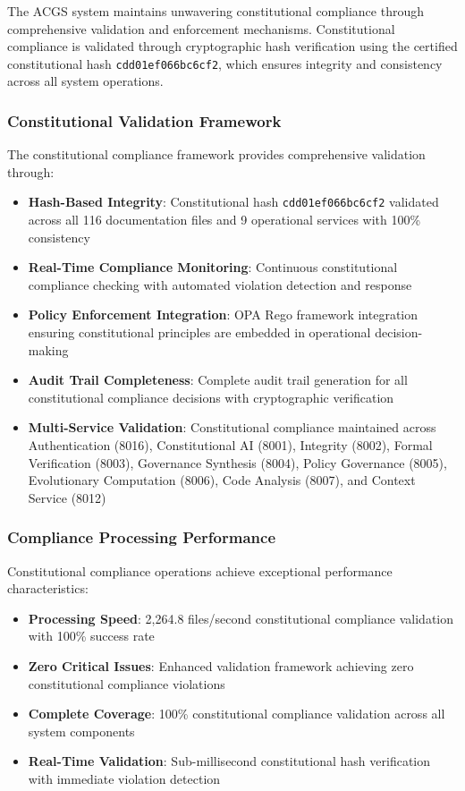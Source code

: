 The ACGS system maintains unwavering constitutional compliance through comprehensive validation and enforcement mechanisms. Constitutional compliance is validated through cryptographic hash verification using the certified constitutional hash \texttt{cdd01ef066bc6cf2}, which ensures integrity and consistency across all system operations.

\subsubsection{Constitutional Validation Framework}
The constitutional compliance framework provides comprehensive validation through:

\begin{itemize}[leftmargin=*,itemsep=2pt,parsep=1pt]
    \item \textbf{Hash-Based Integrity}: Constitutional hash \texttt{cdd01ef066bc6cf2} validated across all 116 documentation files and 9 operational services with 100\% consistency
    \item \textbf{Real-Time Compliance Monitoring}: Continuous constitutional compliance checking with automated violation detection and response
    \item \textbf{Policy Enforcement Integration}: OPA Rego framework integration ensuring constitutional principles are embedded in operational decision-making
    \item \textbf{Audit Trail Completeness}: Complete audit trail generation for all constitutional compliance decisions with cryptographic verification
    \item \textbf{Multi-Service Validation}: Constitutional compliance maintained across Authentication (8016), Constitutional AI (8001), Integrity (8002), Formal Verification (8003), Governance Synthesis (8004), Policy Governance (8005), Evolutionary Computation (8006), Code Analysis (8007), and Context Service (8012)
\end{itemize}

\subsubsection{Compliance Processing Performance}
Constitutional compliance operations achieve exceptional performance characteristics:
\begin{itemize}[leftmargin=*,itemsep=1pt,parsep=1pt]
    \item \textbf{Processing Speed}: 2,264.8 files/second constitutional compliance validation with 100\% success rate
    \item \textbf{Zero Critical Issues}: Enhanced validation framework achieving zero constitutional compliance violations
    \item \textbf{Complete Coverage}: 100\% constitutional compliance validation across all system components
    \item \textbf{Real-Time Validation}: Sub-millisecond constitutional hash verification with immediate violation detection
\end{itemize}

